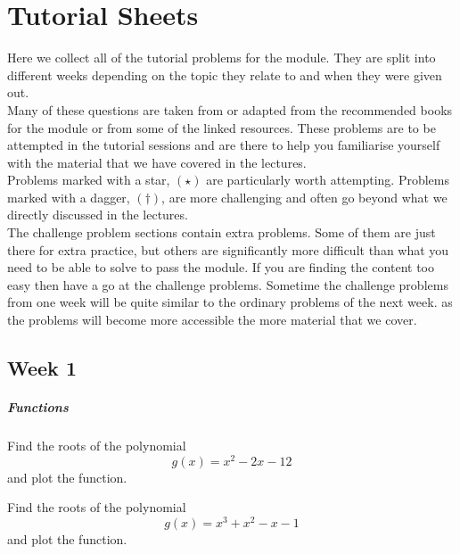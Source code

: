 \chapter{Tutorial Sheets}
\label{sec: tutorial sheets}

Here we collect all of the tutorial problems for the module. They are split into different weeks depending on the topic they relate to and when they were given out.\\

Many of these questions are taken from or adapted from the recommended  books for the module or from some of the linked resources. These problems are to be attempted in the tutorial sessions and are there to help you familiarise yourself with the material that we have covered in the lectures.\\

Problems marked with a star, $(\star)$ are particularly worth attempting. Problems marked with a dagger, $(\dagger)$, are more challenging and often go beyond what we directly discussed in the lectures.\\

The challenge problem sections contain extra problems. Some of them are just there for extra practice, but others are significantly more difficult than what you need to be able to solve to pass the module. If you are finding the content too easy then have a go at the challenge problems. Sometime the challenge problems from one week will be quite similar to the ordinary problems of the next week. as the problems will become more accessible the more material that we cover.

\section{Week 1}
\label{sec: Tutorial sheet 1}
\paragraph{Functions}

\begin{problem}[$\star$]
Find the roots of the polynomial
\begin{equation*}
g(x)=x^2-2x-12
\end{equation*}
and plot the function.
\end{problem}

\begin{problem}
Find the roots of the polynomial
\begin{equation*}
g(x)=x^3+x^2-x-1
\end{equation*}
and plot the function.
\end{problem}

